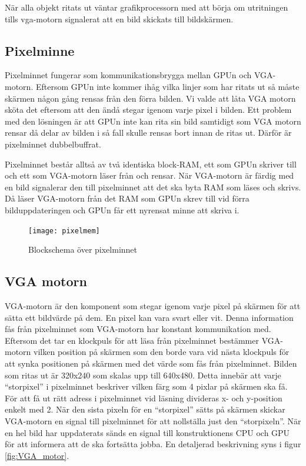 \documentclass[a4paper]{article}
\begin{document}
    När alla objekt ritats ut väntar grafikprocessorn med att börja om
    utritningen tills vga-motorn signalerat att en bild skickats till
    bildskärmen. 

    \subsection{Pixelminne}

    Pixelminnet fungerar som kommunikationsbrygga mellan GPUn och VGA-motorn.
    Eftersom GPUn inte kommer ihåg vilka linjer som har ritats ut så måste
    skärmen någon gång rensas från den förra bilden. Vi valde att låta VGA motorn
    sköta det eftersom att den ändå stegar igenom varje pixel i bilden. Ett problem
    med den lösningen är att GPUn inte kan rita sin bild samtidigt som VGA motorn
    rensar då delar av bilden i så fall skulle rensas bort innan de ritas ut. Därför är
    pixelminnet dubbelbuffrat. 

    Pixelminnet består alltså av två identiska block-RAM, ett som GPUn skriver till och ett
    som VGA-motorn läser från och rensar. När VGA-motorn är färdig med en bild signalerar
    den till pixelminnet att det ska byta RAM som läses och skrivs. Då läser VGA-motorn 
    från det RAM som GPUn skrev till vid förra bilduppdateringen och GPUn får
    ett nyrensat minne att skriva i. 

    \begin{figure}[H]
        \centering
        \texttt{[image: pixelmem]}
        \caption{Blockschema över pixelminnet}
        \label{fig:pixelmem}
    \end{figure}

    \subsection{VGA motorn}

    VGA-motorn är den komponent som stegar igenom varje pixel på skärmen för att
    sätta ett bildvärde på dem. En pixel kan vara svart eller vit. Denna
    information fås från pixelminnet som VGA-motorn har konstant kommunikation
    med. Eftersom det tar en klockpuls för att läsa från pixelminnet bestämmer
    VGA-motorn vilken position på skärmen som den borde vara vid nästa klockpuls
    för att synka positionen på skärmen med det värde som fås från pixelminnet.
    Bilden som ritas ut är 320x240 som skalas upp till 640x480. Detta innebär
    att varje “storpixel” i pixelminnet beskriver vilken färg som 4 pixlar på
    skärmen ska få. För att få ut rätt adress i pixelminnet vid läsning
    divideras x- och y-position enkelt med 2. När den sista pixeln för en
    “storpixel” sätts på skärmen skickar VGA-motorn en signal till pixelminnet
    för att nollställa just den “storpixeln”. När en hel bild har uppdaterats
    sänds en signal till konstruktionens CPU och GPU för att informera att de
    ska fortsätta jobba. En detaljerad beskrivning syns i figur \ref{fig:VGA_motor}. 
\end{document}
